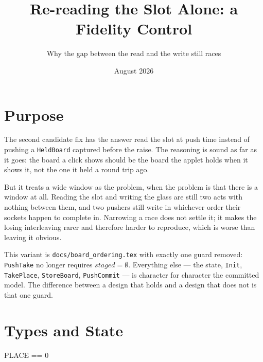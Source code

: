 \documentclass[a4paper,10pt,fleqn]{article}
\begin{document}
\title{Re-reading the Slot Alone: a Fidelity Control}
\author{Why the gap between the read and the write still races}
\date{August 2026}
\maketitle

\section{Purpose}

The second candidate fix has the answer read the slot at push time instead of
pushing a \texttt{HeldBoard} captured before the raise. The reasoning is sound
as far as it goes: the board a click shows should be the board the applet holds
when it shows it, not the one it held a round trip ago.

But it treats a wide window as the problem, when the problem is that there is a
window at all. Reading the slot and writing the glass are still two acts with
nothing between them, and two pushers still write in whichever order their
sockets happen to complete in. Narrowing a race does not settle it; it makes
the losing interleaving rarer and therefore harder to reproduce, which is worse
than leaving it obvious.

This variant is \texttt{docs/board\_ordering.tex} with exactly one guard
removed: \texttt{PushTake} no longer requires $staged = \emptyset$. Everything
else --- the state, \texttt{Init}, \texttt{TakePlace}, \texttt{StoreBoard},
\texttt{PushCommit} --- is character for character the committed model. The
difference between a design that holds and a design that does not is that one
guard.

\section{Types and State}

\begin{zed}
  [WORKER]
\end{zed}

\begin{zed}
  PLACE == 0 
\end{zed}
\end{document}
